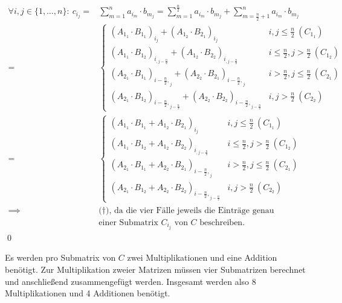 \begin{itemize}
\begin{equation*}
	\end{equation*}
	\begin{equation*}
		\begin{aligned}
			\forall i, j \in \{1, \ldots, n\}:\ c_i_j
			= &\sum_{m = 1}^{n} a_i_m \cdot b_m_j
			= \sum_{m = 1}^{\frac{n}{2}} a_i_m \cdot b_m_j
			+ \sum_{m = \frac{n}{2} + 1}^{n} a_i_m \cdot b_m_j \\
			= &\begin{cases}
				(A_1_1 \cdot B_1_1)_i_j + (A_1_2 \cdot B_2_1)_i_j & i, j \le \frac{n}{2}\ (C_1_1) \\
				(A_1_1 \cdot B_1_2)_i_{, j - \frac{n}{2}} + (A_1_2 \cdot B_2_2)_i_{, j - \frac{n}{2}} & i \le \frac{n}{2}, j > \frac{n}{2}\ (C_1_2) \\
				(A_2_1 \cdot B_1_1)_{i - \frac{n}{2}, }_j + (A_2_2 \cdot B_2_1)_{i - \frac{n}{2}, }_j & i > \frac{n}{2}, j \le \frac{n}{2}\ (C_2_1) \\
				(A_2_1 \cdot B_1_2)_{i  - \frac{n}{2}, }_{j - \frac{n}{2}} + (A_2_2 \cdot B_2_2)_{i  - \frac{n}{2}, }_{j - \frac{n}{2}} & i, j > \frac{n}{2}\ (C_2_2)
			\end{cases} \\
			= &\begin{cases}
				(A_1_1 \cdot B_1_1 + A_1_2 \cdot B_2_1)_i_j & i, j \le \frac{n}{2}\ (C_1_1) \\
				(A_1_1 \cdot B_1_2 + A_1_2 \cdot B_2_2)_i_{, j - \frac{n}{2}} & i \le \frac{n}{2}, j > \frac{n}{2}\ (C_1_2) \\
				(A_2_1 \cdot B_1_1 + A_2_2 \cdot B_2_1)_{i - \frac{n}{2}, }_j & i > \frac{n}{2}, j \le \frac{n}{2}\ (C_2_1) \\
				(A_2_1 \cdot B_1_2 + A_2_2 \cdot B_2_2)_{i  - \frac{n}{2}, }_{j - \frac{n}{2}} & i, j > \frac{n}{2}\ (C_2_2)
			\end{cases} \\
			\implies & \text{($\dagger$), da die vier Fälle jeweils die Einträge genau} \\
			& \text{einer Submatrix $C_i_j$ von $C$ beschreiben.}
			\end{aligned}
	\end{equation*}
	\qed
\end{itemize}

Es werden pro Submatrix von $C$ zwei Multiplikationen und eine Addition benötigt. Zur Multiplikation zweier Matrizen müssen vier Submatrizen berechnet und anschließend zusammengefügt werden. Insgesamt werden also 8 Multiplikationen und 4 Additionen benötigt.

